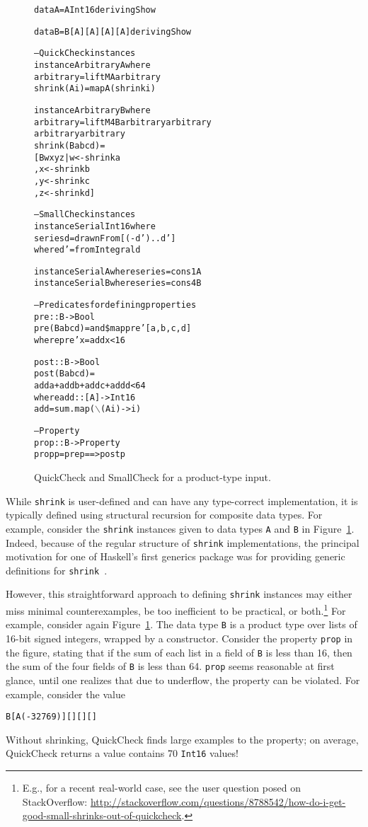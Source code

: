 \documentclass[10pt]{sigplanconf}
\newenvironment{code}{\begin{alltt}}{\end{alltt}}
\newcommand{\ttp}[1]{\texttt{#1}}
\begin{document}
\begin{figure}[ht]
\begin{code}
data A = A Int16 deriving Show

data B = B [A] [A] [A] [A] deriving Show

-- QuickCheck instances
instance Arbitrary A where
  arbitrary    = liftM A arbitrary
  shrink (A i) = map A (shrink i)

instance Arbitrary B where
  arbitrary = liftM4 B arbitrary arbitrary 
                       arbitrary arbitrary
  shrink (B a b c d) = 
    [ B w x y z | w <- shrink a
                , x <- shrink b
                , y <- shrink c
                , z <- shrink d ]

-- SmallCheck instances
instance Serial Int16 where
  series d = drawnFrom [(-d')..d'] 
    where d' = fromIntegral d

instance Serial A where series = cons1 A 
instance Serial B where series = cons4 B

-- Predicates for defining properties
pre :: B -> Bool
pre (B a b c d) = and \$ map pre' [a, b, c, d]
  where pre' x = add x < 16
  
post :: B -> Bool
post (B a b c d) = 
  add a + add b + add c + add d < 64
  where add :: [A] -> Int16
        add = sum . map (\(\backslash\)(A i) -> i)

-- Property
prop :: B -> Property
prop p = pre p ==> post p
\end{code}
  \caption{QuickCheck and SmallCheck for a product-type input.}
  \label{fig:initial}
\end{figure}

While \ttp{shrink} is user-defined and can have any type-correct implementation,
it is typically defined using structural recursion for composite data types.
For example, consider the \ttp{shrink} instances given to data types \ttp{A} and
\ttp{B} in Figure~\ref{fig:initial}.  Indeed, because of the regular structure
of \ttp{shrink} implementations, the principal motivation for one
of Haskell's first generics package was for providing generic definitions for
\ttp{shrink}~\cite{syb}.

However, this straightforward approach to defining \ttp{shrink} instances may
either miss minimal counterexamples, be too inefficient to be practical, or
both.\footnote{E.g., for a recent real-world case, see the user question posed on StackOverflow:
  \url{http://stackoverflow.com/questions/8788542/how-do-i-get-good-small-shrinks-out-of-quickcheck}.}
For example, consider again Figure~\ref{fig:initial}.  The data type \ttp{B} is
a product type over lists of 16-bit signed integers, wrapped by a constructor.
Consider the property \ttp{prop} in the figure, stating that if the sum of each
list in a field of \ttp{B} is less than 16, then the sum of the four fields of
\ttp{B} is less than 64.  \ttp{prop} seems reasonable at first glance, until
one realizes that due to underflow, the property can be violated.  For example,
consider the value
%
\begin{code}
B [A (-32769)] [] [] []
\end{code}
%
\noindent
Without shrinking, QuickCheck finds large examples to the property; on average,
QuickCheck returns a value contains 70 \ttp{Int16} values!
\end{document}
